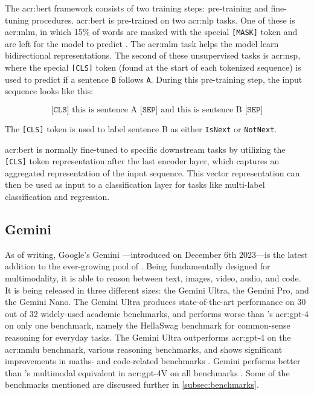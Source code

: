 The \acrshort{acr:bert} framework consists of two training steps: pre-training and fine-tuning procedures. \acrshort{acr:bert} is pre-trained on two \gls{acr:nlp} tasks. One of these is \gls{acr:mlm}, in which 15\% of words are masked with the special \texttt{[MASK]} token and are left for the model to predict \citep[4]{devlinBERTPretrainingDeep2019}. The \gls{acr:mlm} task helps the model learn bidirectional representations. The second of these unsupervised tasks is \gls{acr:nsp}, where the special \texttt{[CLS]} token (found at the start of each tokenized sequence) is used to predict if a sentence \texttt{B} follows \texttt{A}. During this pre-training step, the input sequence looks like this:

$$
    \texttt{[CLS]} \text{ this is sentence A } \texttt{[SEP]} \text{ and this is sentence B } \texttt{[SEP]}
$$

\noindent The \texttt{[CLS]} token is used to label sentence B as either \texttt{IsNext} or \texttt{NotNext}.

\acrshort{acr:bert} is normally fine-tuned to specific downstream tasks by utilizing the \texttt{[CLS]} token representation after the last encoder layer, which captures an aggregated representation of the input sequence. This vector representation can then be used as input to a classification layer for tasks like multi-label classification and regression.

\subsection{Gemini}\label{subsec:gemini}

As of writing, Google's Gemini \citep{geminiteamGeminiFamilyHighly2023}---introduced on December 6th 2023---is the latest addition to the ever-growing pool of . Being fundamentally designed for multimodality, it is able to reason between text, images, video, audio, and code. It is being released in three different sizes: the Gemini Ultra, the Gemini Pro, and the Gemini Nano. The Gemini Ultra produces state-of-the-art performance on 30 out of 32 widely-used academic benchmarks, and performs worse than \citeauthor{openaiGPT4TechnicalReport2023}'s \acrshort{acr:gpt}-4 on only one benchmark, namely the HellaSwag benchmark for common-sense reasoning for everyday tasks. The Gemini Ultra outperforms \acrshort{acr:gpt}-4 on the \gls{acr:mmlu} benchmark, various reasoning benchmarks, and shows significant improvements in maths- and code-related benchmarks \citep[7]{geminiteamGeminiFamilyHighly2023}. Gemini performs better than \citeauthor{openaiGPT4TechnicalReport2023}'s multimodal equivalent in \acrshort{acr:gpt}-4V on all benchmarks \citep[12]{geminiteamGeminiFamilyHighly2023}. Some of the benchmarks mentioned are discussed further in \autoref{subsec:benchmarks}.

